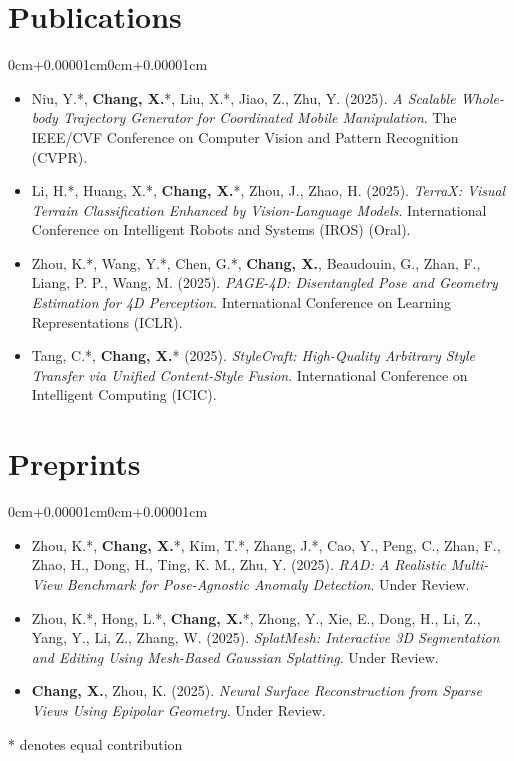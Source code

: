 \documentclass[10pt, letterpaper]{article}
\newenvironment{highlights}{\begin{itemize}[topsep=0.10cm,parsep=0.10cm,partopsep=0pt,itemsep=0pt,leftmargin=0cm+10pt]}{\end{itemize}}
\newenvironment{onecolentry}{\begin{adjustwidth}{0cm+0.00001cm}{0cm+0.00001cm}}{\end{adjustwidth}}
\begin{document}
    \section{Publications}
    
    \begin{onecolentry}
        \begin{highlights}
            \item Niu, Y.*, \textbf{Chang, X.}*, Liu, X.*, Jiao, Z., Zhu, Y. (2025). \textit{A Scalable Whole-body Trajectory Generator for Coordinated Mobile Manipulation}. The IEEE/CVF Conference on Computer Vision and Pattern Recognition (CVPR).
            \item Li, H.*, Huang, X.*, \textbf{Chang, X.}*, Zhou, J., Zhao, H. (2025). \textit{TerraX: Visual Terrain Classification Enhanced by Vision-Language Models}. International Conference on Intelligent Robots and Systems (IROS) (Oral).
            \item Zhou, K.*, Wang, Y.*, Chen, G.*, \textbf{Chang, X.}, Beaudouin, G., Zhan, F., Liang, P. P., Wang, M. (2025). \textit{PAGE-4D: Disentangled Pose and Geometry Estimation for 4D Perception}. International Conference on Learning Representations (ICLR).
            \item Tang, C.*, \textbf{Chang, X.}* (2025). \textit{StyleCraft: High-Quality Arbitrary Style Transfer via Unified Content-Style Fusion}. International Conference on Intelligent Computing (ICIC).
        \end{highlights}
    \end{onecolentry}

    \section{Preprints}
    
    \begin{onecolentry}
        \begin{highlights}
            \item Zhou, K.*, \textbf{Chang, X.}*, Kim, T.*, Zhang, J.*, Cao, Y., Peng, C., Zhan, F., Zhao, H., Dong, H., Ting, K. M., Zhu, Y. (2025). \textit{RAD: A Realistic Multi-View Benchmark for Pose-Agnostic Anomaly Detection}. Under Review.
            \item Zhou, K.*, Hong, L.*, \textbf{Chang, X.}*, Zhong, Y., Xie, E., Dong, H., Li, Z., Yang, Y., Li, Z., Zhang, W. (2025). \textit{SplatMesh: Interactive 3D Segmentation and Editing Using Mesh-Based Gaussian Splatting}. Under Review.
            \item \textbf{Chang, X.}, Zhou, K. (2025). \textit{Neural Surface Reconstruction from Sparse Views Using Epipolar Geometry}. Under Review.
        \end{highlights}
        \vspace{0.2cm}
        \footnotesize{* denotes equal contribution}
    \end{onecolentry}
    
\end{document}
